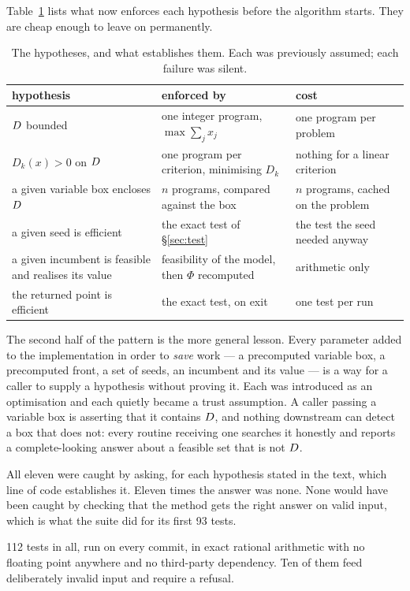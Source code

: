 \documentclass[11pt,a4paper]{article}
\begin{document}
Table~\ref{tab:guards} lists what now enforces each hypothesis before the
algorithm starts.  They are cheap enough to leave on permanently.

\begin{table}[h]
\centering
\caption{The hypotheses, and what establishes them.  Each was previously
assumed; each failure was silent.}
\label{tab:guards}
\begin{tabular}{p{5.2cm}p{4.6cm}p{4.4cm}}
\toprule
hypothesis & enforced by & cost \\
\midrule
$D$ bounded & one integer program, $\max \sum_j x_j$ & one program per
  problem \\
$D_k(x) > 0$ on $D$ & one program per criterion, minimising $D_k$ & nothing
  for a linear criterion \\
a given variable box encloses $D$ & $n$ programs, compared against the box
  & $n$ programs, cached on the problem \\
a given seed is efficient & the exact test of \S\ref{sec:test} & the test the
  seed needed anyway \\
a given incumbent is feasible and realises its value & feasibility of the
  model, then $\Phi$ recomputed & arithmetic only \\
the returned point is efficient & the exact test, on exit & one test per run \\
\bottomrule
\end{tabular}
\end{table}

\noindent
The second half of the pattern is the more general lesson.  Every parameter
added to the implementation in order to \emph{save} work --- a precomputed
variable box, a precomputed front, a set of seeds, an incumbent and its value
--- is a way for a caller to supply a hypothesis without proving it.  Each was
introduced as an optimisation and each quietly became a trust assumption.  A
caller passing a variable box is asserting that it contains $D$, and
nothing downstream can detect a box that does not: every routine receiving one
searches it honestly and reports a complete-looking answer about a feasible set
that is not $D$.

All eleven were caught by asking, for each hypothesis stated in the text, which
line of code establishes it.  Eleven times the answer was none.  None would
have been caught by checking that the method gets the right answer on valid
input, which is what the suite did for its first 93 tests.

112 tests in all, run on every commit, in exact rational arithmetic with
no floating point anywhere and no third-party dependency.  Ten of them feed
deliberately invalid input and require a refusal.
\end{document}
